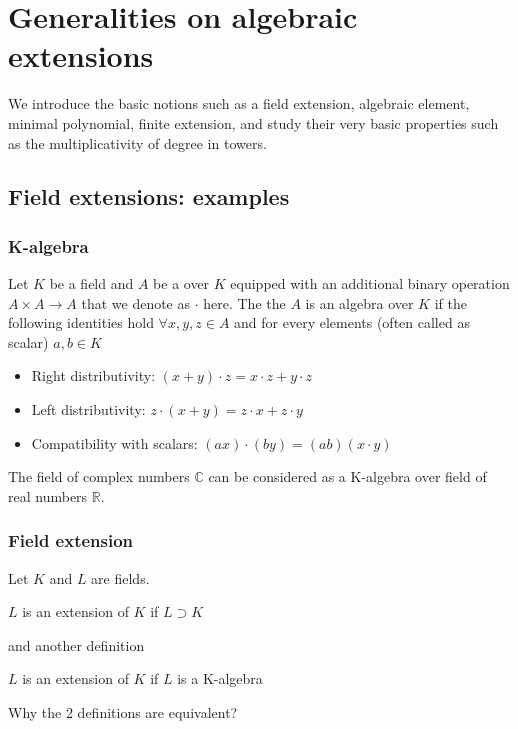 \chapter{Generalities on algebraic extensions}
We introduce the basic notions such as a field extension, algebraic
element, minimal polynomial, finite extension, and study their very
basic properties such as the multiplicativity of degree in towers. 

\section{Field extensions: examples}

\subsection{K-algebra}
\begin{definition}[K-algebra]
  Let $K$ be a field and $A$ be a  over $K$
  equipped with 
  an additional binary operation $A \times A \rightarrow A$ that we
  denote as $\cdot$ here. The the $A$ is an algebra over $K$ if the
  following identities hold $\forall x,y,z \in A$ and for every
  elements (often called as scalar) $a, b \in K$
  \begin{itemize}
  \item Right distributivity:
    $(x + y) \cdot z = x \cdot z + y \cdot z$
  \item Left distributivity:
    $z \cdot (x + y) = z \cdot x + z \cdot y$
  \item Compatibility with scalars:
    $(ax) \cdot (by) = (ab) (x \cdot y)$
  \end{itemize}
  \label{def:kalgebra}
\end{definition}

\begin{example}
  The field of complex numbers $\mathbb{C}$ can be considered as a
  K-algebra over field of real numbers $\mathbb{R}$.
  \label{ex:complexnumbers}
\end{example}

\subsection{Field extension}

Let $K$ and $L$ are fields.
\begin{definition}
  $L$ is an extension of $K$ if $L \supset K$
  \label{def:fextension1}
\end{definition}
and another definition
\begin{definition}
  $L$ is an extension of $K$ if $L$ is a K-algebra
  \label{def:fextension2}
\end{definition}
Why the 2 definitions are equivalent?

